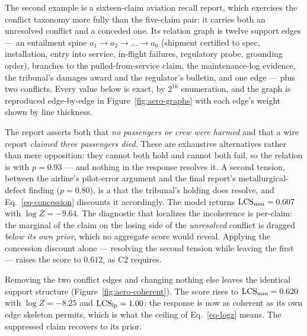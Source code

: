 

The second example is a sixteen-claim aviation recall report, which exercises the conflict taxonomy
more fully than the five-claim pair: it carries both an unresolved conflict and a conceded one. Its
relation graph is twelve support edges ---
an entailment spine $a_1\!\to\!a_2\!\to\!\dots\!\to\!a_6$ (shipment certified to spec, installation,
entry into service, in-flight failures, regulatory probe, grounding order), branches to the
pulled-from-service claim, the maintenance-log evidence, the tribunal's damages award and the
regulator's bulletin, and one \eqv{} edge --- plus two conflicts. Every value below is exact, by
$2^{16}$ enumeration, and the graph is reproduced edge-by-edge in Figure~\ref{fig:aero-graphs} with
each edge's weight shown by line thickness.

\begin{example}[Incoherent]
\label{ex-incoherent}
The report asserts both that \emph{no passengers or crew were harmed} and that a wire report
\emph{claimed three passengers died}. These are exhaustive alternatives rather than mere opposition:
they cannot both hold and cannot both fail, so the relation is \exc{} with $p=0.93$ --- and nothing in
the response resolves it. A second tension, between the airline's pilot-error argument and the final
report's metallurgical-defect finding ($p=0.80$), is a  that the tribunal's holding
does resolve, and Eq.~\ref{eq-concession} discounts it accordingly. The model returns
$\mathrm{LCS}_{\mathrm{mm}}=0.607$ with $\log Z=-9.64$. The diagnostic that localizes the incoherence is per-claim: the
marginal of the claim on the losing side of the \emph{unresolved} conflict is dragged \emph{below its
own prior}, which no aggregate score would reveal. Applying the concession discount alone --- resolving
the second tension while leaving the first --- raises the score to $0.612$, as C2 requires.
\end{example}

\begin{example}[Coherent]
\label{ex-coherent}
Removing the two conflict edges and changing nothing else leaves the identical support structure
(Figure~\ref{fig:aero-coherent}). The score rises to $\mathrm{LCS}_{\mathrm{mm}}=0.620$ with $\log Z=-8.25$ and
$\mathrm{LCS}_{\mathrm{lp}}=1.00$: the response is now as coherent as its own edge skeleton permits, which is what the
ceiling of Eq.~\ref{eq-logz} means. The suppressed claim recovers to its prior.
\end{example}

